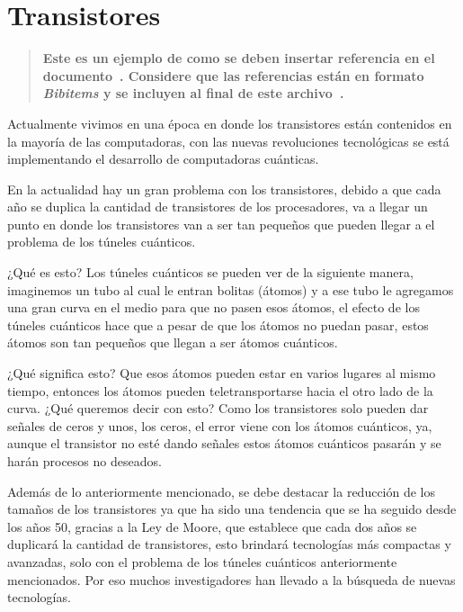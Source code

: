 \documentclass{article}
\begin{document}


\tableofcontents




\newpage

\section{Transistores}


\begin{quote}
    \textbf{Este es un ejemplo de como se deben insertar referencia en el documento~\cite{conagua-2011}. Considere que las referencias están en formato \textit{Bibitems} y se incluyen al final de este archivo~\cite{conagua-2011,undesa2008}.}
\end{quote}


Actualmente vivimos en una época en donde los transistores están contenidos en la mayoría de las computadoras, con las nuevas revoluciones tecnológicas se está implementando el desarrollo de computadoras cuánticas.   

En la actualidad hay un gran problema con los transistores, debido a que cada año se duplica la cantidad de transistores de los procesadores, va a llegar un punto en donde los transistores van a ser tan pequeños que pueden llegar a el problema de los túneles cuánticos.  

¿Qué es esto?  Los túneles cuánticos se pueden ver de la siguiente manera, imaginemos un tubo al cual le entran bolitas (átomos) y a ese tubo le agregamos una gran curva en el medio para que no pasen esos átomos, el efecto de los túneles cuánticos hace que a pesar de que los átomos no puedan pasar, estos átomos son tan pequeños que llegan a ser átomos cuánticos.  

¿Qué significa esto? Que esos átomos pueden estar en varios lugares al mismo tiempo, entonces los átomos pueden teletransportarse hacia el otro lado de la curva. ¿Qué queremos decir con esto? Como los transistores solo pueden dar señales de ceros y unos, los ceros, el error viene con los átomos cuánticos, ya, aunque el transistor no esté dando señales estos átomos cuánticos pasarán y se harán procesos no deseados. 

Además de lo anteriormente mencionado, se debe destacar la reducción de los tamaños de los transistores ya que ha sido una tendencia que se ha seguido desde los años 50, gracias a la Ley de Moore, que establece que cada dos años se duplicará la cantidad de transistores, esto brindará tecnologías más compactas y avanzadas, solo con el problema de los túneles cuánticos anteriormente mencionados. Por eso muchos investigadores han llevado a la búsqueda de nuevas tecnologías. 
\end{document}
